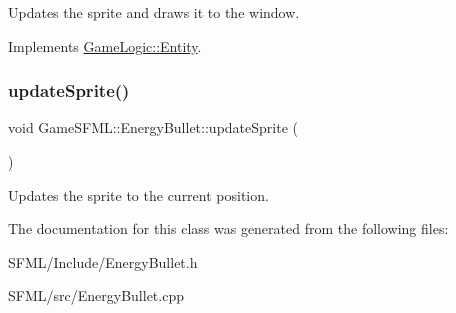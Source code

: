 Updates the sprite and draws it to the window. 

Implements \hyperlink{classGameLogic_1_1Entity_adf23a7036cb99dfc6e33434018131da4}{Game\+Logic\+::\+Entity}.

\mbox{\label{classGameSFML_1_1EnergyBullet_a692e9ae4d828deec21e832986a734ca7}} 
\subsubsection{\texorpdfstring{update\+Sprite()}{updateSprite()}}
{\footnotesize\ttfamily void Game\+S\+F\+M\+L\+::\+Energy\+Bullet\+::update\+Sprite (\begin{DoxyParamCaption}{ }\end{DoxyParamCaption})}

Updates the sprite to the current position. 

The documentation for this class was generated from the following files\+:\begin{DoxyCompactItemize}
\item 
S\+F\+M\+L/\+Include/Energy\+Bullet.\+h\item 
S\+F\+M\+L/src/Energy\+Bullet.\+cpp\end{DoxyCompactItemize}
